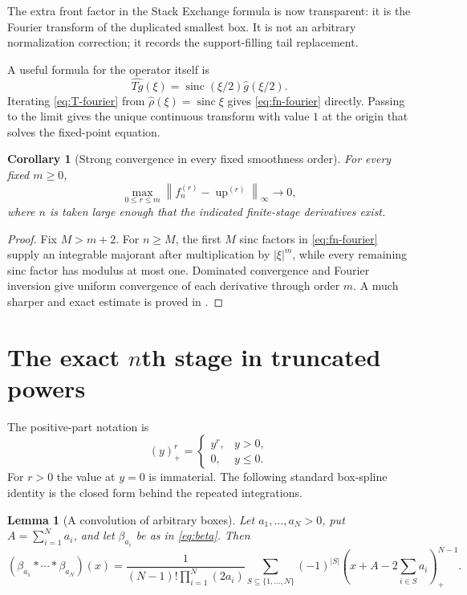\documentclass[11pt,oneside]{article}
\newtheorem{lemma}[theorem]{Lemma}
\newtheorem{corollary}[theorem]{Corollary}
\theoremstyle{definition}
\theoremstyle{remark}
\newcommand{\Up}{\operatorname{up}}
\newcommand{\sinc}{\operatorname{sinc}}
\newcommand{\norm}[1]{\left\lVert #1\right\rVert}
\newcommand{\pos}[1]{\left(#1\right)_{+}}
\begin{document}
The extra front factor in the Stack Exchange formula is now transparent: it is the Fourier
transform of the duplicated smallest box.  It is not an arbitrary normalization correction;
it records the support-filling tail replacement.

A useful formula for the operator itself is
\begin{equation}
 \widehat{Tg}(\xi)=\sinc(\xi/2)\widehat g(\xi/2).           \label{eq:T-fourier}
\end{equation}
Iterating \eqref{eq:T-fourier} from $\widehat\rho(\xi)=\sinc\xi$ gives
\eqref{eq:fn-fourier} directly.  Passing to the limit gives the unique continuous transform
with value $1$ at the origin that solves the fixed-point equation.

\begin{corollary}[Strong convergence in every fixed smoothness order]
\label{cor:Cm-convergence}
For every fixed $m\ge0$,
\begin{equation}
 \max_{0\le r\le m}\norm{f_n^{(r)}-\Up^{(r)}}_\infty\longrightarrow0,        \label{eq:Cm-convergence}
\end{equation}
where $n$ is taken large enough that the indicated finite-stage derivatives exist.
\end{corollary}

\begin{proof}
Fix $M>m+2$.  For $n\ge M$, the first $M$ sinc factors in \eqref{eq:fn-fourier} supply an
integrable majorant after multiplication by $|\xi|^m$, while every remaining sinc factor has
modulus at most one.  Dominated convergence and Fourier inversion give uniform convergence of
each derivative through order $m$.  A much sharper and exact estimate is proved in
.
\end{proof}

\section{The exact \texorpdfstring{$n$th}{n-th} stage in truncated powers}
\label{sec:closed-form}

The positive-part notation is
\[
 \pos y^r=\begin{cases}y^r,&y>0,\\0,&y\le0.\end{cases}
\]
For $r>0$ the value at $y=0$ is immaterial.  The following standard box-spline identity is the
closed form behind the repeated integrations.

\begin{lemma}[A convolution of arbitrary boxes]
\label{lem:general-box-spline}
Let $a_1,\ldots,a_N>0$, put $A=\sum_{i=1}^{N}a_i$, and let
$\beta_{a_i}$ be as in \eqref{eq:beta}.  Then
\begin{equation}
 (\beta_{a_1}*\cdots*\beta_{a_N})(x)
 =\frac{1}{(N-1)!\prod_{i=1}^{N}(2a_i)}
 \sum_{S\subseteq\{1,\ldots,N\}}(-1)^{|S|}
 \pos{x+A-2\sum_{i\in S}a_i}^{N-1}.                       \label{eq:general-box-spline}
\end{equation}
\end{lemma}
\end{document}
